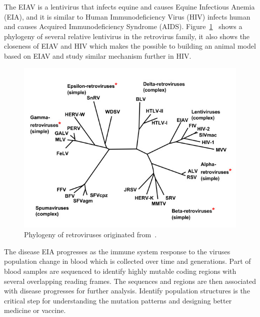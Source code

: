 The EIAV is a lentivirus that
infects equine and causes Equine Infectious Anemia (EIA), and it is similar
to Human Immunodeficiency Virus (HIV) infects human and causes Acquired
Immunodeficiency Syndrome (AIDS).
Figure~\ref{fig:retrovirus}~\citep{Weiss2006}
shows a phylogeny of several relative lentivirus
in the retrovirus family, it also shows the closeness of EIAV and HIV which
makes the possible to building an animal model based on EIAV and study similar
mechanism further in HIV.
\begin{figure}[h!tb]
\centering
 \includegraphics[width=5.0in]{pbdDEMO-include/pics/Phylogeny_of_Retroviruses}
\caption{Phylogeny of retroviruses originated from~\citet{Weiss2006}.}
\label{fig:retrovirus}
\end{figure}

The disease EIA progresses as the immune system
response to the viruses population change in blood which is collected
over time and generations. Part of blood samples are sequenced to identify
highly mutable coding regions with several overlapping reading frames. The
sequences and regions are then associated with disease progresses for
further analysis. Identify population structures is the critical step for
understanding the mutation patterns and designing better medicine or vaccine.

